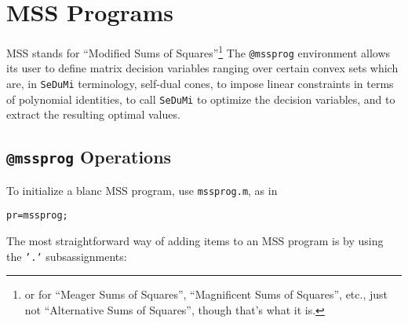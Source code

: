 \documentclass[12pt]{article}
\begin{document}
\section{MSS Programs}

MSS stands for ``Modified Sums of Squares''\footnote{or for ``Meager Sums of Squares'',
``Magnificent Sums of Squares'', etc., just not ``Alternative Sums of Squares'',
though that's what it is. }
The {\tt @mssprog} environment allows its user to define 
matrix decision variables ranging over certain convex sets which are, in {\tt SeDuMi}
terminology, self-dual cones, to impose linear constraints in terms of polynomial
identities, to call {\tt SeDuMi} to optimize the decision variables, and to
extract the resulting optimal values.

\subsection{{\tt @mssprog} Operations}
To initialize a blanc MSS program, use {\tt mssprog.m}, as in
\begin{verbatim}
pr=mssprog;
\end{verbatim}
The most straightforward way of adding items to an MSS program is by using the
{\tt '.'} subsassignments:
\end{document}
